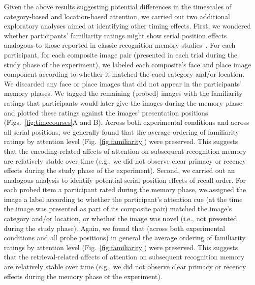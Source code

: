 \documentclass[english]{article}
\begin{document}
Given the above results suggesting potential differences in the timescales of
category-based and location-based attention, we carried out two additional
exploratory analyses aimed at identifying other timing effects. First, we
wondered whether participants' familiarity ratings might show serial position
effects analogous to those reported in classic recognition memory
studies~\citep[e.g.,][]{Neat93b, McElDosh89, WickNorm66}. For each participant,
for each composite image pair (presented in each trial during the study phase
of the experiment), we labeled each composite's face and place image component
according to whether it matched the cued category and/or location. We discarded
any face or place images that did not appear in the participants' memory
phases. We tagged the remaining (probed) images with the familiarity ratings
that participants would later give the images during the memory phase and
plotted these ratings against the images' presentation positions
(Figs.~\ref{fig:timecourses}A and B). Across both experimental conditions and
across all serial positions, we generally found that the average ordering of
familiarity ratings by attention level (Fig.~\ref{fig:familiarity}) were
preserved. This suggests that the encoding-related affects of attention on
subsequent recognition memory are relatively stable over time (e.g., we did not
observe clear primacy or recency effects during the study phase of the
experiment). Second, we carried out an analogous analysis to identify potential
serial position effects of recall order. For each probed item a participant
rated during the memory phase, we assigned the image a label according to
whether the participant's attention cue (at the time the image was presented as
part of its composite pair) matched the image's category and/or location, or
whether the image was novel (i.e., not presented during the study phase).
Again, we found that (across both experimental conditions and all probe
positions) in general the average ordering of familiarity ratings by attention
level (Fig.~\ref{fig:familiarity}) were preserved. This suggests that the
retrieval-related affects of attention on subsequent recognition memory are
relatively stable over time (e.g., we did not observe clear primacy or recency
effects during the memory phase of the experiment).
\end{document}
